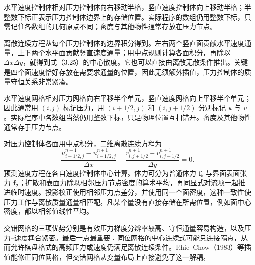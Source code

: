 \documentclass[11pt,a4paper,openany,fontset=none]{ctexbook}
\newenvironment{sourceblock}
  {\par\addvspace{0.65\baselineskip}\noindent\begin{minipage}{\linewidth}\centering}
  {\end{minipage}\par\addvspace{0.48\baselineskip}}
\begin{document}
\begin{sourceblock}
\end{sourceblock}

水平速度控制体相对压力控制体向右移动半格，竖直速度控制体向上移动半格；半整数下标正表示压力控制体边界上的存储位置。实际程序的数组仍用整数下标，只需记住各数组的几何原点不同；密度与其他物性通常存放在压力节点。

离散连续方程从每个压力控制体的边界积分得到。左右两个竖直面贡献水平速度通量，上下两个水平面贡献竖直速度通量；用中点规则计算各面积分，再除以 $\Delta x\Delta y$，就得到式（3.25）的中心散度。它也可以直接由离散无散条件推出。关键是四个面速度恰好存放在需要求通量的位置，因此无须额外插值，压力控制体的质量守恒关系非常紧凑。

水平速度网格相对压力网格向右平移半个单元，竖直速度网格向上平移半个单元；因此通常用 $(i,j)$ 标记压力，用 $(i+1/2,j)$ 和 $(i,j+1/2)$ 分别标记 $u$ 与 $v$。实际程序中各数组当然仍用整数下标，只是物理位置互相错开。密度及其他物性通常存于压力节点。

\begin{sourceblock}
\end{sourceblock}

对压力控制体各面用中点积分，二维离散连续方程为
\begin{equation}
 \frac{u_{i+1/2,j}^{n+1}-u_{i-1/2,j}^{n+1}}{\Delta x}
 +\frac{v_{i,j+1/2}^{n+1}-v_{i,j-1/2}^{n+1}}{\Delta y}=0. \tag{3.25}
\end{equation}
预测速度方程在各自速度控制体中心计算。体力可分为普通体力 $\bm f_b$ 与界面表面张力 $\bm f_\sigma$；扩散和表面力除以相邻压力节点密度的算术平均，再同显式对流项一起推进临时速度。投影校正使用相邻压力点差分，并使用同一个面密度，这种一致性使压力工作与离散质量通量相匹配。凡某个量没有直接存储在所需位置，例如面中心密度，都以相邻值线性平均。

交错网格的三项优势分别是有效压力梯度分辨率较高、守恒通量容易构造，以及压力--速度耦合紧密。最后一点最重要：同位网格的中心连续式可能只连接隔点，从而允许棋盘格式的高频压力或速度仍满足离散连续条件。Rhie--Chow（1983）等插值能修正同位网格，但交错网格从变量布局上直接避免了这一解耦。
\end{document}
